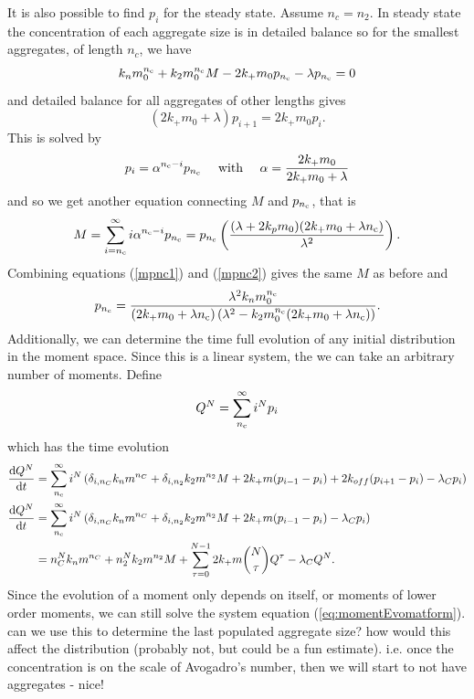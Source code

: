It is also possible to find $p_i$ for the steady state. Assume $n_c=n_2$. In steady state the concentration of each aggregate size is in detailed balance so for the smallest aggregates, of length $n_c$, we have
\begin{equation}
    k_n m_0^{n_{\mathrm{c}}} + k_2 m_0^{n_{\mathrm{c}}} M - 2 k_+ m_0 p_{n_{\mathrm{c}}} - \lambda p_{n_{\mathrm{c}}} = 0
    \label{mpnc2}
\end{equation}
and detailed balance for all aggregates of other lengths gives
\begin{equation}
    (2k_+ m_0 + \lambda)p_{i+1} = 2k_+ m_0 p_i.
\end{equation}
This is solved by
\begin{equation}
    p_i = \alpha^{n_{\mathrm{c}}-i} p_{n_{\mathrm{c}}}\quad\text{ with }\quad\alpha=\frac{2k_+ m_0}{2k_+ m_0 + \lambda}
\end{equation}
and so we get another equation connecting $M$ and $p_{n_{\mathrm{c}}}$, that is
\begin{equation}
    M = \sum_{i=n_{\mathrm{c}}}^{\infty}i\alpha^{n_{\mathrm{c}}-i} p_{n_{\mathrm{c}}} = p_{n_{\mathrm{c}}}\left( \frac{(\lambda +2k_p m_0) (2 k_+ m_0 + \lambda  n_{\mathrm{c}})}{\lambda^2} \right).
    \label{mpnc2}
\end{equation}
Combining equations (\ref{mpnc1}) and (\ref{mpnc2}) gives the same $M$ as before and 
\begin{equation}
    p_{n_{\mathrm{c}}} = \frac{\lambda^2 k_n m_0^{n_{\mathrm{c}}} }{(2 k_+ m_0+\lambda n_{\mathrm{c}}) \left(\lambda ^2-k_2 m_0^{n_{\mathrm{c}}} (2 k_+ m_0+\lambda  n_{\mathrm{c}})\right)}.
\end{equation}
Additionally, we can determine the time full evolution of any initial distribution in the moment space. Since this is a linear system, the we can take an arbitrary number of moments. Define
\begin{equation}
    Q^{N} = \sum_{n_{\mathrm{c}}}^\infty i^N p_i
\end{equation}
which has the time evolution
\begin{equation}
\begin{split}
    \frac{\text{d}Q^{N}}{\text{d}t} &= \sum_{n_{\mathrm{c}}}^\infty i^N \left( \delta_{i, n_C}k_n m^{n_C} + \delta_{i, n_2} k_2 m^{n_2} M + 2k_+ m (p_{i-1}-p_i) + 2k_{off} (p_{i+1}-p_i) - \lambda_C p_i \right) \\
    \frac{\text{d}Q^{N}}{\text{d}t} &= \sum_{n_{\mathrm{c}}}^\infty i^N \left( \delta_{i, n_C}k_n m^{n_C} + \delta_{i, n_2} k_2 m^{n_2} M + 2k_+ m (p_{i-1}-p_i) - \lambda_C p_i \right) \\
    &=n_C^N k_n m^{n_C} + n_2^N k_2 m^{n_2} M + \sum_{\tau=0}^{N-1} 2k_+ m \binom{N}{\tau} Q^{\tau} - \lambda_C Q^{N}.
\end{split}
\end{equation}
Since the evolution of a moment only depends on itself, or moments of lower order moments, we can still solve the system equation (\ref{eq:momentEvomatform}).
can we use this to determine the last populated aggregate size? how would this affect the distribution (probably not, but could be a fun estimate). i.e. once the concentration is on the scale of Avogadro's number, then we will start to not have aggregates - nice!

